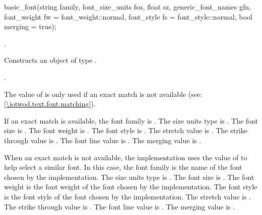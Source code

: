 %
\begin{itemdecl}
basic_font(string family, font_size_units fsu, float sz,
  generic_font_names gfn, font_weight fw = font_weight::normal,
  font_style fs = font_style::normal, bool merging = true);
\end{itemdecl}
\begin{itemdescr}
\pnum
\requires {}.

\pnum
\effects Constructs an object of type .

\pnum
\postconditions {}.

\pnum
\remarks The value of  is only used if an exact match is not available (see: \ref{\iotwod.text.font.matching}).

\pnum
If an exact match is available, the font family is . The size units type is . The font size is . The font weight is . The font style is . The stretch value is . The strike through value is . The font line value is . The merging value is .

\pnum When an exact match is not available, the implementation uses the value of  to help select a similar font. In this case, the font family is the name of the font chosen by the implementation. The size units type is . The font size is . The font weight is the font weight of the font chosen by the implementation. The font style is the font style of the font chosen by the implementation. The stretch value is . The strike through value is . The font line value is . The merging value is .
\end{itemdescr}


